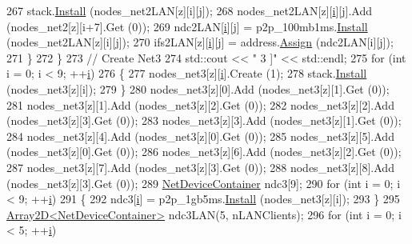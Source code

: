 \begin{DoxyCode}
267               stack.\hyperlink{classns3_1_1InternetStackHelper_a6645b412f31283d2d9bc3d8a95cebbc0}{Install} (nodes\_net2LAN[z][i][j]);
268               nodes\_net2LAN[z][\hyperlink{bernuolliDistribution_8m_a6f6ccfcf58b31cb6412107d9d5281426}{i}][j].Add (nodes\_net2[z][i+7].Get (0));
269               ndc2LAN[\hyperlink{bernuolliDistribution_8m_a6f6ccfcf58b31cb6412107d9d5281426}{i}][j] = p2p\_100mb1ms.\hyperlink{classns3_1_1PointToPointHelper_ab9162fea3e88722666fed1106df1f9ec}{Install} (nodes\_net2LAN[z][i][j]);
270               ifs2LAN[z][\hyperlink{bernuolliDistribution_8m_a6f6ccfcf58b31cb6412107d9d5281426}{i}][j] = address.\hyperlink{classns3_1_1Ipv4AddressHelper_af8e7f4a1a7e74c00014a1eac445a27af}{Assign} (ndc2LAN[i][j]);
271             \}
272         \}
273       \textcolor{comment}{// Create Net3}
274       std::cout << \textcolor{stringliteral}{" 3 ]"} << std::endl;
275       \textcolor{keywordflow}{for} (\textcolor{keywordtype}{int} i = 0; i < 9; ++\hyperlink{bernuolliDistribution_8m_a6f6ccfcf58b31cb6412107d9d5281426}{i}) 
276         \{
277           nodes\_net3[z][\hyperlink{bernuolliDistribution_8m_a6f6ccfcf58b31cb6412107d9d5281426}{i}].Create (1);
278           stack.\hyperlink{classns3_1_1InternetStackHelper_a6645b412f31283d2d9bc3d8a95cebbc0}{Install} (nodes\_net3[z][i]);
279         \}
280       nodes\_net3[z][0].Add (nodes\_net3[z][1].Get (0));
281       nodes\_net3[z][1].Add (nodes\_net3[z][2].Get (0));
282       nodes\_net3[z][2].Add (nodes\_net3[z][3].Get (0));
283       nodes\_net3[z][3].Add (nodes\_net3[z][1].Get (0));
284       nodes\_net3[z][4].Add (nodes\_net3[z][0].Get (0));
285       nodes\_net3[z][5].Add (nodes\_net3[z][0].Get (0));
286       nodes\_net3[z][6].Add (nodes\_net3[z][2].Get (0));
287       nodes\_net3[z][7].Add (nodes\_net3[z][3].Get (0));
288       nodes\_net3[z][8].Add (nodes\_net3[z][3].Get (0));
289       \hyperlink{classns3_1_1NetDeviceContainer}{NetDeviceContainer} ndc3[9];
290       \textcolor{keywordflow}{for} (\textcolor{keywordtype}{int} i = 0; i < 9; ++\hyperlink{bernuolliDistribution_8m_a6f6ccfcf58b31cb6412107d9d5281426}{i}) 
291         \{
292           ndc3[\hyperlink{bernuolliDistribution_8m_a6f6ccfcf58b31cb6412107d9d5281426}{i}] = p2p\_1gb5ms.\hyperlink{classns3_1_1PointToPointHelper_ab9162fea3e88722666fed1106df1f9ec}{Install} (nodes\_net3[z][i]);
293         \}
295       \hyperlink{classArray2D}{Array2D<NetDeviceContainer>} ndc3LAN(5, nLANClients);
296       \textcolor{keywordflow}{for} (\textcolor{keywordtype}{int} i = 0; i < 5; ++\hyperlink{bernuolliDistribution_8m_a6f6ccfcf58b31cb6412107d9d5281426}{i}) 

\end{DoxyCode}

